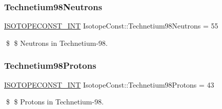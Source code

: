 \subsubsection{\texorpdfstring{Technetium98\+Neutrons}{Technetium98Neutrons}}
{\footnotesize\ttfamily \mbox{\hyperlink{group___isotope_const-_macros_ga5f18360b3e99483a35c32d789e62621c}{I\+S\+O\+T\+O\+P\+E\+C\+O\+N\+S\+T\+\_\+\+I\+NT}} Isotope\+Const\+::\+Technetium98\+Neutrons = 55}

\$ \$ Neutrons in Technetium-\/98. \mbox{\label{group___isotope_const-_technetium-_tc98_gac87b061b206fdd204f5bc412e5245e89}} 
\subsubsection{\texorpdfstring{Technetium98\+Protons}{Technetium98Protons}}
{\footnotesize\ttfamily \mbox{\hyperlink{group___isotope_const-_macros_ga5f18360b3e99483a35c32d789e62621c}{I\+S\+O\+T\+O\+P\+E\+C\+O\+N\+S\+T\+\_\+\+I\+NT}} Isotope\+Const\+::\+Technetium98\+Protons = 43}

\$ \$ Protons in Technetium-\/98. 